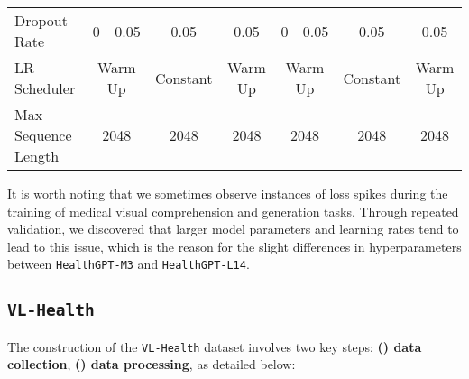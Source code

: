 \begin{table}[h!]
{\begin{tabular}{l|cc|cc|cc|cc|cc|cc}
    \cellcolor[HTML]{DAE0FB}
    Dropout Rate & 0 & 0.05 & \multicolumn{2}{c|}{0.05} & \multicolumn{2}{c|}{0.05} & 0 & 0.05 & \multicolumn{2}{c|}{0.05} & \multicolumn{2}{c}{0.05} \\
    \cellcolor[HTML]{DAE0FB}
    LR Scheduler & \multicolumn{2}{c|}{Warm Up} & \multicolumn{2}{c|}{Constant} & \multicolumn{2}{c|}{Warm Up} & \multicolumn{2}{c|}{Warm Up} & \multicolumn{2}{c|}{Constant} & \multicolumn{2}{c}{Warm Up} \\
    \cellcolor[HTML]{DAE0FB}
    Max Sequence Length & \multicolumn{2}{c|}{2048} & \multicolumn{2}{c|}{2048} & \multicolumn{2}{c|}{2048} & \multicolumn{2}{c|}{2048} & \multicolumn{2}{c|}{2048} & \multicolumn{2}{c}{2048} \\ 
    \bottomrule
    \end{tabular}
    }
    \label{tab:parameters}
\end{table}

It is worth noting that we sometimes observe instances of loss spikes during the training of medical visual comprehension and generation tasks. Through repeated validation, we discovered that larger model parameters and learning rates tend to lead to this issue, which is the reason for the slight differences in hyperparameters between \texttt{HealthGPT-M3} and \texttt{HealthGPT-L14}.

\subsection{\texttt{VL-Health}}
The construction of the \texttt{VL-Health} dataset involves two key steps: \textbf{() data collection}, \textbf{() data processing}, as detailed below:

